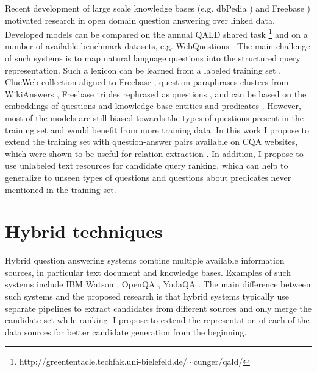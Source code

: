 Recent development of large scale knowledge bases (e.g. dbPedia \cite{auer2007dbpedia}) and Freebase \cite{Bollacker:2008:FCC:1376616.1376746}) motivated research in open domain question answering over linked data.
Developed models can be compared on the annual QALD shared task \footnote{http://greententacle.techfak.uni-bielefeld.de/$\sim$cunger/qald/} and on a number of available benchmark datasets, e.g. WebQuestions \cite{BerantCFL13:sempre}.
The main challenge of such systems is to map natural language questions into the structured query representation.
Such a lexicon can be learned from a labeled training set \cite{BerantCFL13:sempre},  ClueWeb collection aligned to Freebase \cite{ReddyLS14,YaoD14}, question paraphrases clusters from WikiAnswers \cite{BerantL14:parasempre}, Freebase triples rephrased as questions \cite{BordesCW14:emnlp}, and can be based on the embeddings of questions and knowledge base entities and predicates \cite{BordesCW14:emnlp,yih:ACL:2015:STAGG}.
However, most of the models are still biased towards the types of questions present in the training set and would benefit from more training data.
In this work I propose to extend the training set with question-answer pairs available on CQA websites, which were shown to be useful for relation extraction \cite{SavenkovLDA15}.
In addition, I propose to use unlabeled text resources for candidate query ranking, which can help to generalize to unseen types of questions and questions about predicates never mentioned in the training set.

\section{Hybrid techniques}

Hybrid question answering systems combine multiple available information sources, in particular text document and knowledge bases.
Examples of such systems include IBM Watson \cite{Ferrucci10:DeepQA}, OpenQA \cite{Fader:2014:OQA:2623330.2623677}, YodaQA \cite{baudivs2015modeling}.
The main difference between such systems and the proposed research is that hybrid systems typically use separate pipelines to extract candidates from different sources and only merge the candidate set while ranking.
I propose to extend the representation of each of the data sources for better candidate generation from the beginning.


\clearpage